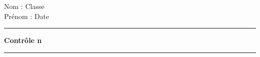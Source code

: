 \documentclass[a4paper,11pt]{article}
\newcommand{\titre}[5] 
{
\noindent #2 \hfill #4 \\
#3 \hfill #5

\vspace{-1.6cm}

\begin{center}\rule{6cm}{0.5mm}\end{center}
\vspace{0.2cm}
\begin{center}{\large{\textbf{#1}}}\end{center}
\begin{center}\rule{6cm}{0.5mm}\end{center}
}
\begin{document}
\pagestyle{empty}
\titre{Contrôle n}{Nom :}{Prénom :}{Classe}{Date}
\end{document}
